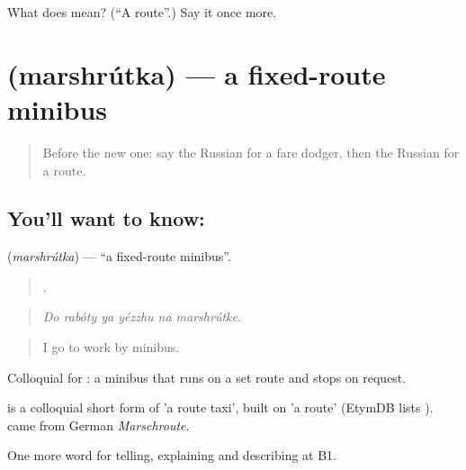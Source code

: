 \begin{tcolorbox}[breakable,colback=teal!4,colframe=teal!35!black,title={Before you move on}]
What does  mean? (\textquotedblleft{}A route\textquotedblright{}.) Say it once more.
\end{tcolorbox}
\section[\texorpdfstring{\ru{маршрутка} (marshrútka)}{маршрутка (marshrútka)}]{ (marshrútka) — a fixed-route minibus}

\label{lesson:RU-C417-marshrutka}



\begin{quote}
Before the new one: say the Russian for a fare dodger, then the Russian for a route.
\end{quote}

\subsection*{You'll want to know: }
\textbf{} (\emph{marshrútka}) — \textquotedblleft{}a fixed-route minibus\textquotedblright{}.

\begin{quote}
     .
\end{quote}

\begin{quote}
\emph{Do rabóty ya yézzhu na marshrútke.}
\end{quote}

\begin{quote}
I go to work by minibus.
\end{quote}

Colloquial for \emph{ }: a minibus that runs on a set route and stops on request.

\begin{cousinweb}
\emph{} is a colloquial short form of \emph{ } 'a route taxi', built on \emph{} 'a route' (EtymDB lists \emph{}). \emph{} came from German \emph{Marschroute}.
\end{cousinweb}

\begin{grammarlens}[title={What you've built}]
One more word for telling, explaining and describing at B1.
\end{grammarlens}

